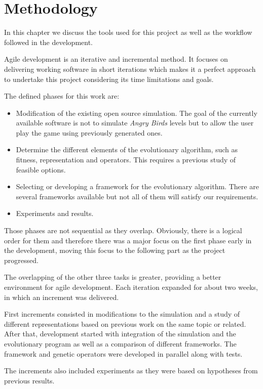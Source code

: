 \chapter{Methodology}\label{ch:workflow}

In this chapter we discuss the tools used for this project as well as the workflow followed in the development. 

Agile development is an iterative and incremental method. It focuses on delivering working software in short iterations which makes it a perfect approach to undertake this project considering its time limitations and goals.

The defined phases for this work are:
\begin{itemize}
	\item Modification of the existing open source simulation. The goal of the currently available software is not to simulate \textit{Angry Birds} levels but to allow the user play the game using previously generated ones. 
	\item Determine the different elements of the evolutionary algorithm, such as fitness, representation and operators. This requires a previous study of feasible options. 
	\item Selecting or developing a framework for the evolutionary algorithm. There are several frameworks available but not all of them will satisfy our requirements. 
	\item Experiments and results.
\end{itemize}

Those phases are not sequential as they overlap. Obviously, there is a logical order for them and therefore there was a major focus on the first phase early in the development, moving this focus to the following part as the project progressed. 

The overlapping of the other three tasks is greater, providing a better environment for agile development. Each iteration expanded for about two weeks, in  which an increment was delivered. 

First increments consisted in modifications to the simulation and a study of different representations based on previous work on the same topic or related. After that, development started with integration of the simulation and the evolutionary program as well as a comparison of different frameworks. The framework and genetic operators were developed in parallel along with tests.

The increments also included experiments as they were based on hypotheses from previous results. 

